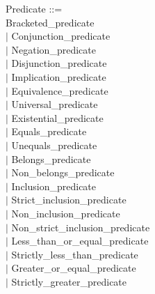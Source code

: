 \documentclass[12pt,a4paper,draft]{report}
\begin{document}
{\begin{sloppypar}
\noindent Predicate ::= \\
\hspace*{0.20in}   Bracketed\_predicate\\
\hspace*{0.20in} $|$  Conjunction\_predicate\\
\hspace*{0.20in} $|$  Negation\_predicate\\
\hspace*{0.20in} $|$  Disjunction\_predicate\\
\hspace*{0.20in} $|$  Implication\_predicate\\
\hspace*{0.20in} $|$  Equivalence\_predicate\\
\hspace*{0.20in} $|$  Universal\_predicate\\
\hspace*{0.20in} $|$  Existential\_predicate\\
\hspace*{0.20in} $|$  Equals\_predicate\\
\hspace*{0.20in} $|$  Unequals\_predicate\\
\hspace*{0.20in} $|$  Belongs\_predicate\\
\hspace*{0.20in} $|$  Non\_belongs\_predicate\\
\hspace*{0.20in} $|$  Inclusion\_predicate\\
\hspace*{0.20in} $|$  Strict\_inclusion\_predicate\\
\hspace*{0.20in} $|$  Non\_inclusion\_predicate\\
\hspace*{0.20in} $|$  Non\_strict\_inclusion\_predicate\\
\hspace*{0.20in} $|$  Less\_than\_or\_equal\_predicate\\
\hspace*{0.20in} $|$  Strictly\_less\_than\_predicate\\
\hspace*{0.20in} $|$  Greater\_or\_equal\_predicate\\
\hspace*{0.20in} $|$  Strictly\_greater\_predicate\\

\end{sloppypar}}
\end{document}
